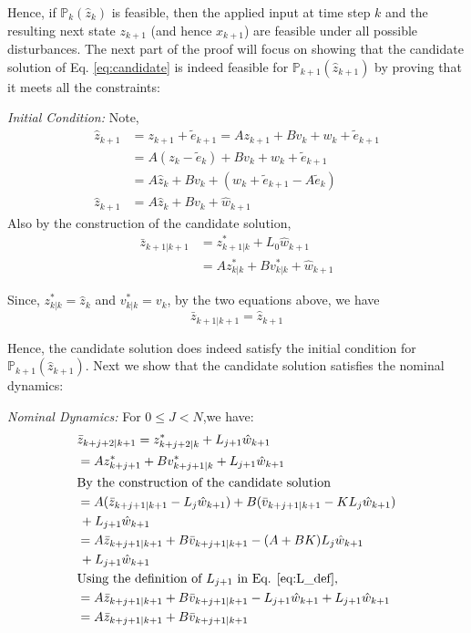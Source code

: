 Hence, if $\mathbb{P}_{k}(\hat{z}_k)$ is feasible, then the applied input at time step $k$ and the resulting next state $z_{k+1}$ (and hence $x_{k+1}$) are feasible under all possible disturbances. 
The next part of the proof will focus on showing that the candidate solution of Eq. \ref{eq:candidate} is indeed feasible for $\mathbb{P}_{k+1}(\hat{z}_{k+1})$ by proving that it meets all the constraints:

\textit{Initial Condition:} Note,
\begin{subequations}
\begin{align}
\hat{z}_{k+1} &= z_{k+1} + \tilde{e}_{k+1} = Az_{k+1} + Bv_k +w_k +\tilde{e}_{k+1} \\
&= A(z_k-\tilde{e}_k) + Bv_k + w_k +\tilde{e}_{k+1} \\
&= A\hat{z}_k + Bv_k + (w_k + \tilde{e}_{k+1} -A\tilde{e}_k)  \\
\hat{z}_{k+1}&=A\hat{z}_k + Bv_k + \hat{w}_{k+1}
\end{align}
\end{subequations}
Also by the construction of the candidate solution,
\begin{subequations}
\begin{align}
\bar{z}_{k+1|k+1} &= z^{*}_{k+1|k} + L_0 \hat{w}_{k+1} \\
&= Az^{*}_{k|k} + Bv^{*}_{k|k} + \hat{w}_{k+1}
\end{align}
\end{subequations}

Since, $z^{*}_{k|k}=\hat{z}_k$ and $v^{*}_{k|k} = v_k$, by the two equations above, we have
\begin{equation}
\bar{z}_{k+1|k+1} = \hat{z}_{k+1}
\end{equation}

Hence, the candidate solution does indeed satisfy the initial condition for $\mathbb{P}_{k+1}(\hat{z}_{k+1})$. Next we show that the candidate solution satisfies the nominal dynamics:

\textit{ Nominal Dynamics:} For $0\leq J<N$,we have:
\begin{subequations}
\begin{align}
&\bar{z}_{k+j+2|k+1} = z^{*}_{k+j+2|k} + L_{j+1}\hat{w}_{k+1} \\
&= Az^{*}_{k+j+1}+Bv^{*}_{k+j+1|k} + L_{j+1}\hat{w}_{k+1} \\
& \text{By the construction of the candidate solution} \nonumber \\
& = A(\bar{z}_{k+j+1|k+1}-L_j\hat{w}_{k+1}) + B(\bar{v}_{k+j+1|k+1} - KL_j \hat{w}_{k+1}) \nonumber \\
&\, + L_{j+1}\hat{w}_{k+1} \\
& = A\bar{z}_{k+j+1|k+1} + B\bar{v}_{k+j+1|k+1} -(A+BK)L_j\hat{w}_{k+1} \nonumber \\
&\,+ L_{j+1}\hat{w}_{k+1} \\
&\text{Using the definition of $L_{j+1}$ in Eq. \ref{eq:L_def},} \nonumber \\
& = A\bar{z}_{k+j+1|k+1} + B\bar{v}_{k+j+1|k+1} - L_{j+1}\hat{w}_{k+1} + L_{j+1}\hat{w}_{k+1} \\
& = A\bar{z}_{k+j+1|k+1} + B\bar{v}_{k+j+1|k+1}
\end{align}
\end{subequations}

